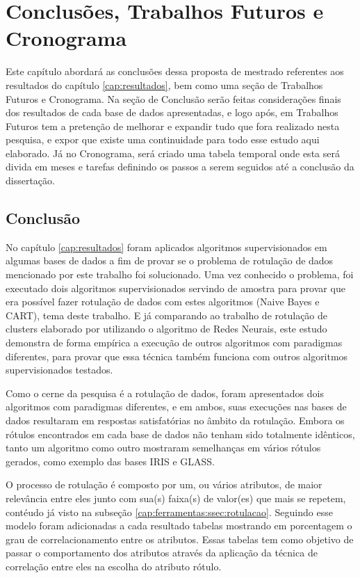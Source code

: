 \chapter{Conclusões, Trabalhos Futuros e Cronograma}\label{cap:conclusao} 

Este capítulo abordará as conclusões dessa  proposta de mestrado referentes aos resultados do capítulo \ref{cap:resultados},  bem como uma seção de Trabalhos Futuros e  Cronograma. Na seção de Conclusão serão feitas considerações finais dos resultados de cada base de dados apresentadas, e logo após, em Trabalhos Futuros tem a pretenção de melhorar e expandir tudo que fora realizado  nesta pesquisa, e expor que existe uma continuidade para todo esse estudo aqui elaborado. Já no Cronograma, será criado uma tabela temporal onde esta será divida em meses e tarefas definindo os passos a serem seguidos até a conclusão da dissertação.

\section{Conclusão}\label{cond}
No capítulo \ref{cap:resultados} foram aplicados algoritmos supervisionados em algumas bases de dados a fim de provar se o problema  de rotulação de dados mencionado por este  trabalho foi solucionado. Uma vez conhecido o problema, foi executado dois algoritmos supervisionados servindo de amostra para provar que era possível fazer rotulação de dados com estes algoritmos (Naive Bayes e CART), tema deste trabalho. E já comparando ao trabalho de rotulação de clusters elaborado por  utilizando o algoritmo de Redes Neurais, este estudo demonstra de forma empírica a execução de outros algoritmos com paradigmas diferentes, para provar que essa técnica também funciona com outros algoritmos supervisionados testados.

Como o cerne da pesquisa é a rotulação de dados, foram apresentados dois algoritmos com paradigmas diferentes, e em ambos, suas execuções nas bases de dados resultaram em respostas satisfatórias no âmbito da rotulação. Embora os rótulos encontrados  em cada base de dados não tenham sido totalmente idênticos, tanto um algoritmo como outro mostraram semelhanças em vários rótulos gerados, como exemplo das bases IRIS e GLASS.

O processo de rotulação é composto por um, ou vários atributos, de maior relevância entre eles junto com sua(s) faixa(s) de valor(es) que mais se repetem, contéudo já visto na subseção \ref{cap:ferramentas:ssec:rotulacao}. Seguindo esse modelo foram adicionadas a cada resultado tabelas mostrando em porcentagem o grau de correlacionamento entre os atributos. Essas tabelas tem como objetivo de passar o comportamento dos atributos através da aplicação da técnica de  correlação entre eles na escolha do atributo rótulo.

